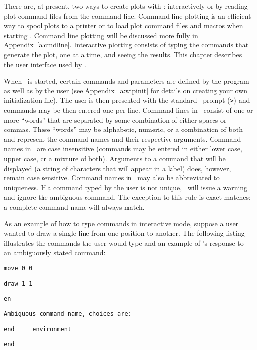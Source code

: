 %
%

There are, at present, two ways to create plots with \wip: interactively
or by reading plot command files from the command line.
Command line plotting is an efficient way to spool plots to a printer or
to load plot command files and macros when starting \wip.
Command line plotting will be discussed more fully in Appendix~\ref{a:cmdline}.
Interactive plotting consists of typing the
commands that generate the plot, one at a time, and seeing the results.
This chapter describes the user interface used by \wip.

When \wip\ is started, certain commands and parameters
are defined by the program as well as by the user
(see Appendix~\ref{a:wipinit}
for details on creating your own initialization file).
The user is then presented with the standard \wip\ prompt (\wip\verb+>+)
and commands may be then entered one per line.
Command lines in \wip\ consist of one or more ``words'' that are
separated by some combination of either spaces or commas.
These ``words'' may be alphabetic, numeric, or a combination of both and
represent the command names and their respective arguments.
Command names in \wip\ are case insensitive (\ie commands may be entered in
either lower case, upper case,
or a mixture of both).
Arguments to a command that will be displayed
(\eg a string of characters that will appear in a
label) does, however, remain case sensitive.
Command names in \wip\ may also be abbreviated to uniqueness.
If a command typed by the user is not unique, \wip\ will issue a warning
and ignore the ambiguous command.
The exception to this rule is exact matches;
a complete command name will always match.

As an example of how to type commands in interactive mode, suppose a
user wanted to draw a single line from one position to another.
The following listing illustrates the commands the user would type
and an example of \wip's response to an ambiguously stated command:
\begin{wiplist}%
  \item {\tt move 0 0}
\samepage
  \item {\tt draw 1 1}
  \item {\tt en}
  \item [\ ] {\tt Ambiguous command name, choices are:}
  \item [\ ] {\tt end ~~~ environment}
  \item {\tt end}
\end{wiplist}

